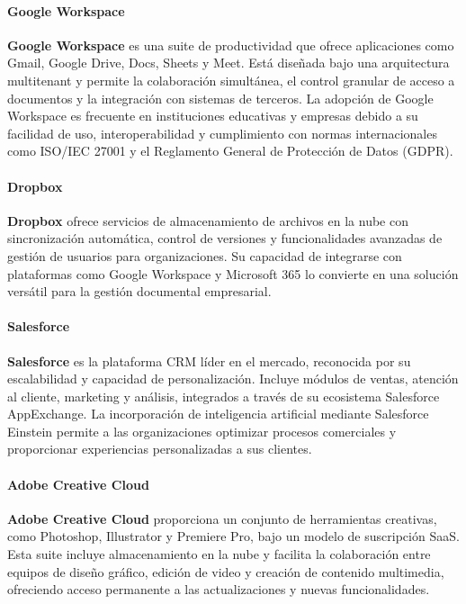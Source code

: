 {            \paragraph{Google Workspace} \textbf{Google Workspace} es una suite de productividad que ofrece aplicaciones como Gmail, Google Drive, Docs, Sheets y Meet. Está diseñada bajo una arquitectura multitenant y permite la colaboración simultánea, el control granular de acceso a documentos y la integración con sistemas de terceros. La adopción de Google Workspace es frecuente en instituciones educativas y empresas debido a su facilidad de uso, interoperabilidad y cumplimiento con normas internacionales como ISO/IEC 27001 y el Reglamento General de Protección de Datos (GDPR).
            
            \paragraph{Dropbox} \textbf{Dropbox} ofrece servicios de almacenamiento de archivos en la nube con sincronización automática, control de versiones y funcionalidades avanzadas de gestión de usuarios para organizaciones. Su capacidad de integrarse con plataformas como Google Workspace y Microsoft 365 lo convierte en una solución versátil para la gestión documental empresarial.
            
            \paragraph{Salesforce} \textbf{Salesforce} es la plataforma CRM líder en el mercado, reconocida por su escalabilidad y capacidad de personalización. Incluye módulos de ventas, atención al cliente, marketing y análisis, integrados a través de su ecosistema Salesforce AppExchange. La incorporación de inteligencia artificial mediante Salesforce Einstein permite a las organizaciones optimizar procesos comerciales y proporcionar experiencias personalizadas a sus clientes.
            
            \paragraph{Adobe Creative Cloud} \textbf{Adobe Creative Cloud} proporciona un conjunto de herramientas creativas, como Photoshop, Illustrator y Premiere Pro, bajo un modelo de suscripción SaaS. Esta suite incluye almacenamiento en la nube y facilita la colaboración entre equipos de diseño gráfico, edición de video y creación de contenido multimedia, ofreciendo acceso permanente a las actualizaciones y nuevas funcionalidades.
            
}
